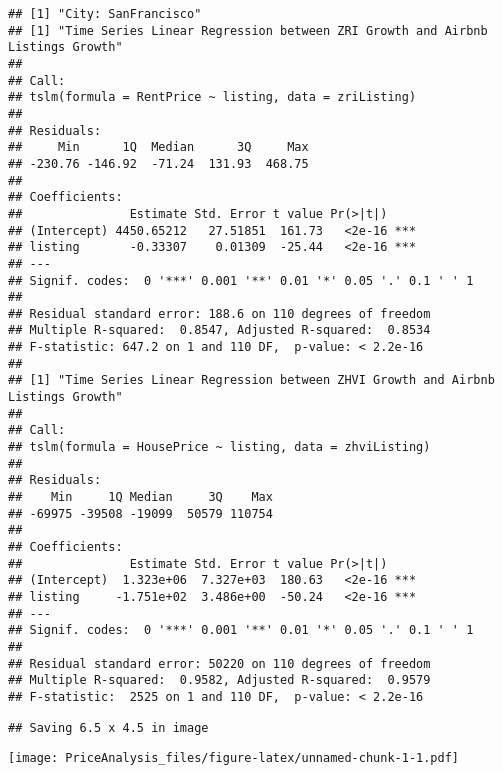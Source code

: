 \documentclass[
]{article}
\begin{document}
\begin{verbatim}
## [1] "City: SanFrancisco"
## [1] "Time Series Linear Regression between ZRI Growth and Airbnb Listings Growth"
## 
## Call:
## tslm(formula = RentPrice ~ listing, data = zriListing)
## 
## Residuals:
##     Min      1Q  Median      3Q     Max 
## -230.76 -146.92  -71.24  131.93  468.75 
## 
## Coefficients:
##               Estimate Std. Error t value Pr(>|t|)    
## (Intercept) 4450.65212   27.51851  161.73   <2e-16 ***
## listing       -0.33307    0.01309  -25.44   <2e-16 ***
## ---
## Signif. codes:  0 '***' 0.001 '**' 0.01 '*' 0.05 '.' 0.1 ' ' 1
## 
## Residual standard error: 188.6 on 110 degrees of freedom
## Multiple R-squared:  0.8547, Adjusted R-squared:  0.8534 
## F-statistic: 647.2 on 1 and 110 DF,  p-value: < 2.2e-16
## 
## [1] "Time Series Linear Regression between ZHVI Growth and Airbnb Listings Growth"
## 
## Call:
## tslm(formula = HousePrice ~ listing, data = zhviListing)
## 
## Residuals:
##    Min     1Q Median     3Q    Max 
## -69975 -39508 -19099  50579 110754 
## 
## Coefficients:
##               Estimate Std. Error t value Pr(>|t|)    
## (Intercept)  1.323e+06  7.327e+03  180.63   <2e-16 ***
## listing     -1.751e+02  3.486e+00  -50.24   <2e-16 ***
## ---
## Signif. codes:  0 '***' 0.001 '**' 0.01 '*' 0.05 '.' 0.1 ' ' 1
## 
## Residual standard error: 50220 on 110 degrees of freedom
## Multiple R-squared:  0.9582, Adjusted R-squared:  0.9579 
## F-statistic:  2525 on 1 and 110 DF,  p-value: < 2.2e-16
\end{verbatim}

\begin{verbatim}
## Saving 6.5 x 4.5 in image
\end{verbatim}

\texttt{[image: PriceAnalysis\_files/figure-latex/unnamed-chunk-1-1.pdf]}
\end{document}
